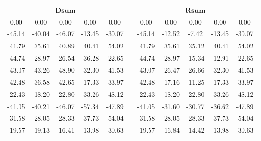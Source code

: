 \documentclass[11pt,a4paper,openright,twoside]{article}
\begin{document}
\begin{table}[h!]
\centering
\begin{tabular}{ccccccccccc}
\multicolumn{5}{c}{$\mathbf{Dsum}$} & & \multicolumn{5}{c}{$\mathbf{Rsum}$}\\
\cline{1-5} \cline{7-11}
0.00 & 0.00 & 0.00 & 0.00 & 0.00 &  & 0.00 & 0.00 & 0.00 & 0.00 & 0.00 \\
-45.14 & -40.04 & -46.07 & -13.45 & -30.07 &  & -45.14 & -12.52 & -7.42 & -13.45 & -30.07\\
-41.79 & -35.61 & -40.89 & -40.41 & -54.02 &  & -41.79 & -35.61 & -35.12 & -40.41 & -54.02\\
-44.74 & -28.97 & -26.54 & -36.28 & -22.65 &  & -44.74 & -28.97 & -15.34 & -12.91 & -22.65\\
-43.07 & -43.26 & -48.90 & -32.30 & -41.53 &  & -43.07 & -26.47 & -26.66 & -32.30 & -41.53\\
-42.48 & -36.58 & -42.65 & -17.33 & -33.97 &  & -42.48 & -17.16 & -11.25 & -17.33 & -33.97\\
-22.43 & -18.20 & -22.80 & -33.26 & -48.12 &  & -22.43 & -18.20 & -22.80 & -33.26 & -48.12\\
-41.05 & -40.21 & -46.07 & -57.34 & -47.89 &  & -41.05 & -31.60 & -30.77 & -36.62 & -47.89\\
-31.58 & -28.05 & -28.33 & -37.73 & -54.04 &  & -31.58 & -28.05 & -28.33 & -37.73 & -54.04\\
-19.57 & -19.13 & -16.41 & -13.98 & -30.63 &  & -19.57 & -16.84 & -14.42 & -13.98 & -30.63\\
\end{tabular}
\end{table}
\end{document}
